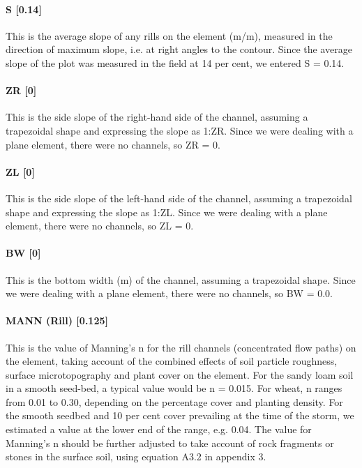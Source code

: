 \paragraph{S [0.14]}
This is the average slope of any rills on the element (m/m), measured in the
direction of maximum slope, i.e. at right angles to the contour. Since the
average slope of the plot was measured in the field at 14 per cent, we entered S
= 0.14.
 
\paragraph{ZR [0]}
This is the side slope of the right-hand side of the channel, assuming a
trapezoidal shape and expressing the slope as 1:ZR. Since we were dealing with a
plane element, there were no channels, so ZR = 0.
 
\paragraph{ZL [0]}
This is the side slope of the left-hand side of the channel, assuming a
trapezoidal shape and expressing the slope as 1:ZL. Since we were dealing with a
plane element, there were no channels, so ZL = 0.
 
\paragraph{BW [0]}
This is the bottom width (m) of the channel, assuming a trapezoidal shape.
Since we were dealing with a plane element, there were no channels, so BW = 0.0.
 
\paragraph{MANN (Rill) [0.125]}
This is the value of Manning's n for the rill channels (concentrated flow
paths) on the element, taking account of the combined effects of soil particle
roughness, surface microtopography and plant cover on the element. For the sandy
loam soil in a smooth seed-bed, a typical value would be n = 0.015. For wheat, n
ranges from 0.01 to 0.30, depending on the percentage cover and planting
density. For the smooth seedbed and 10 per cent cover prevailing at the time of
the storm, we estimated a value at the lower end of the range, e.g. 0.04.
The value for Manning's n should be further adjusted to take account of rock
fragments or stones in the surface soil, using equation A3.2 in appendix 3.
 
